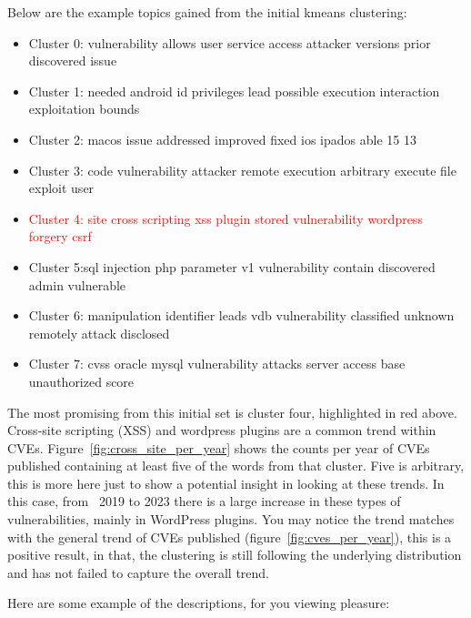 \documentclass[12pt]{article}
\begin{document}
Below are the example topics gained from the initial kmeans clustering:
\begin{itemize}

	\item Cluster 0: vulnerability allows user service access attacker versions prior discovered issue

	\item Cluster 1: needed android id privileges lead possible execution interaction exploitation bounds

	\item Cluster 2: macos issue addressed improved fixed ios ipados able 15 13

	\item Cluster 3: code vulnerability attacker remote execution arbitrary execute file exploit user

	\item \textcolor{red}{Cluster 4: site cross scripting xss plugin stored vulnerability wordpress
		      forgery csrf}

	\item Cluster 5:sql injection php parameter v1 vulnerability contain discovered
	      admin vulnerable

	\item Cluster 6: manipulation identifier leads vdb vulnerability classified unknown remotely attack disclosed

	\item Cluster 7: cvss oracle mysql vulnerability attacks server access base unauthorized score
\end{itemize}

The most promising from this initial set is cluster four, highlighted in red above. Cross-site
scripting (XSS) and wordpress plugins are a common trend within CVEs.
Figure~\ref{fig:cross_site_per_year} shows the counts per year of CVEs published containing at least five of the
words from that cluster. Five is arbitrary, this is more here just to show a potential insight in
looking at these trends. In this case, from ~2019 to 2023 there is a large increase in these types
of vulnerabilities, mainly in WordPress plugins. You may notice the trend matches with the general
trend of CVEs published (figure~\ref{fig:cves_per_year}), this is a positive result, in that, the clustering
is still following the underlying distribution and has not failed to capture the overall trend.

Here are some example of the descriptions, for you viewing pleasure:
\end{document}
